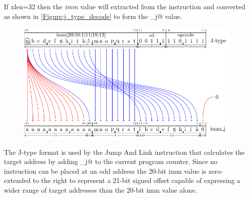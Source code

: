 

If \Gls{xlen}=32 then the {\em imm} value will extracted from the
instruction and converted as shown in \autoref{Figure:j_type_decode} to
form the \verb@imm_j@ value.

\begin{figure}[ht]
  \centering
  \includegraphics{figures/chapter05/JTypeDecode.pdf}
  \label{Figure:j_type_decode}
  \label{imm.j:decode}
\end{figure}


%
%
%
%

The J-type format is used by the Jump And Link instruction that calculates
the target address by adding \verb@imm_j@ to the current program
counter.  Since no instruction can be placed at an odd address the 20-bit
imm value is zero-extended to the right to represent a 21-bit signed offset
capable of expressing a wider range of target addresses than the 20-bit
imm value alone.

